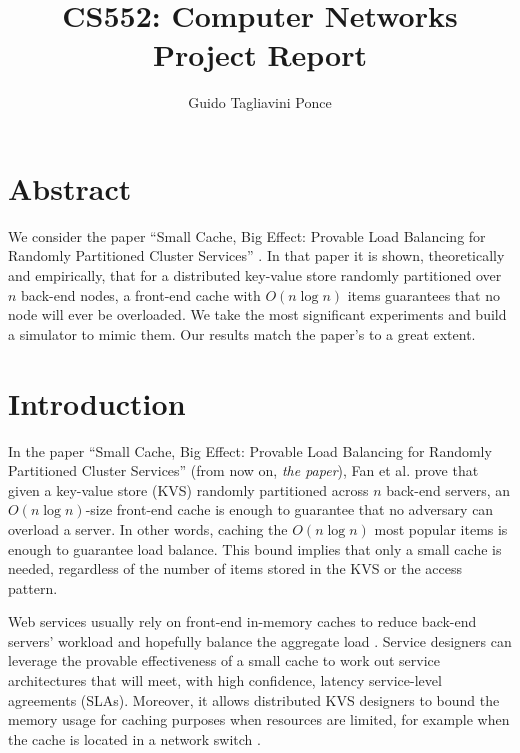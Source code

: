 \documentclass[10pt,letterpaper]{article}
\title{
	\textbf{CS552: Computer Networks\\
	Project Report}}
\author{Guido Tagliavini Ponce}
\begin{document}
\maketitle

\section*{Abstract}

We consider the paper ``Small Cache, Big Effect: Provable Load Balancing for Randomly Partitioned Cluster Services'' \cite{SmallCache}. In that paper it is shown, theoretically and empirically, that for a distributed key-value store randomly partitioned over $n$ back-end nodes, a front-end cache with $O(n \log n)$ items guarantees that no node will ever be overloaded. We take the most significant experiments and build a simulator to mimic them. Our results match the paper's to a great extent.

\tableofcontents

\section{Introduction}

In the paper ``Small Cache, Big Effect: Provable Load Balancing for Randomly Partitioned Cluster Services'' \cite{SmallCache} (from now on, \textit{the paper}), Fan et al. prove that given a key-value store (KVS) randomly partitioned across $n$ back-end servers, an $O(n \log n)$-size front-end cache is enough to guarantee that no adversary can overload a server. In other words, caching the $O(n \log n)$ most popular items is enough to guarantee load balance. This bound implies that only a small cache is needed, regardless of the number of items stored in the KVS or the access pattern.

Web services usually rely on front-end in-memory caches to reduce back-end servers' workload and hopefully balance the aggregate load \cite{Huang14}. Service designers can leverage the provable effectiveness of a small cache to work out service architectures that will meet, with high confidence, latency service-level agreements (SLAs). Moreover, it allows distributed KVS designers to bound the memory usage for caching purposes when resources are limited, for example when the cache is located in a network switch \cite{Li16}\cite{Jin17}.
\end{document}
